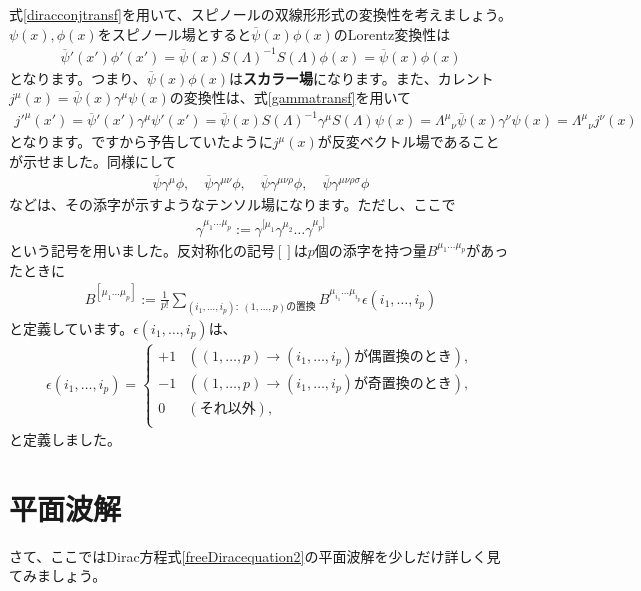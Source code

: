 \documentclass[report,paper=a4, fontsize=12pt, line_length=16cm, number_of_lines=33,dvipdfmx]{jlreq}
\numberwithin{equation}{chapter}
\newcommand{\strong}[1]{{\sffamily \bfseries #1}}
\newcommand{\psib}{\overline{\psi}}
\begin{document}
式\eqref{diracconjtransf}を用いて、スピノールの双線形形式の変換性を考えましょう。$\psi(x),\phi(x)$をスピノール場とすると$\psib(x)\phi(x)$のLorentz変換性は
\begin{align}
  \psib'(x')\phi'(x')
  =\psib(x)S(\Lambda)^{-1}S(\Lambda)\phi(x)
  =\psib(x)\phi(x)
\end{align}
となります。つまり、$\psib(x)\phi(x)$は\strong{スカラー場}になります。また、カレント$j^{\mu}(x)=\psib(x)\gamma^{\mu}\psi(x)$の変換性は、式\eqref{gammatransf}を用いて
\begin{align}
  j'^{\mu}(x')
  =\psib'(x')\gamma^{\mu}\psi'(x')
  =\psib(x)S(\Lambda)^{-1}\gamma^{\mu}S(\Lambda)\psi(x)
  =\Lambda^{\mu}{}_{\nu}\psib(x)\gamma^{\nu}\psi(x)
  =\Lambda^{\mu}{}_{\nu}j^{\nu}(x)
\end{align}
となります。ですから予告していたように$j^{\mu}(x)$が反変ベクトル場であることが示せました。同様にして
\begin{align}
  \psib \gamma^{\mu}\phi,\quad
  \psib \gamma^{\mu\nu}\phi,\quad
  \psib \gamma^{\mu\nu\rho}\phi,\quad
  \psib \gamma^{\mu\nu\rho\sigma}\phi
\end{align}
などは、その添字が示すようなテンソル場になります。ただし、ここで
\begin{align}
  \gamma^{\mu_1\dots \mu_p}:=\gamma^{[\mu_1}\gamma^{\mu_2}\dots \gamma^{\mu_p]}
\end{align}
という記号を用いました。反対称化の記号$[]$は$p$個の添字を持つ量$B^{\mu_1\dots \mu_p}$があったときに
\begin{align}
  B^{[\mu_1\dots \mu_p]}:=\frac{1}{p!}\sum_{(i_1,\dots,i_p):\ (1,\dots, p)\text{の置換}}B^{\mu_{i_1}\dots \mu_{i_p}}\epsilon(i_1,\dots,i_p)
\end{align}
と定義しています。$\epsilon(i_1,\dots,i_p)$は、
\begin{align}
  \epsilon(i_1,\dots,i_p)=
  \begin{cases}
    +1 & ((1,\dots,p)\to (i_1,\dots,i_p)\text{が偶置換のとき}),\\
    -1 & ((1,\dots,p)\to (i_1,\dots,i_p)\text{が奇置換のとき}),\\
    0 & (\text{それ以外}),\\
  \end{cases}
\end{align}
と定義しました。

\section{平面波解}
さて、ここではDirac方程式\eqref{freeDiracequation2}の平面波解を少しだけ詳しく見てみましょう。
\end{document}
